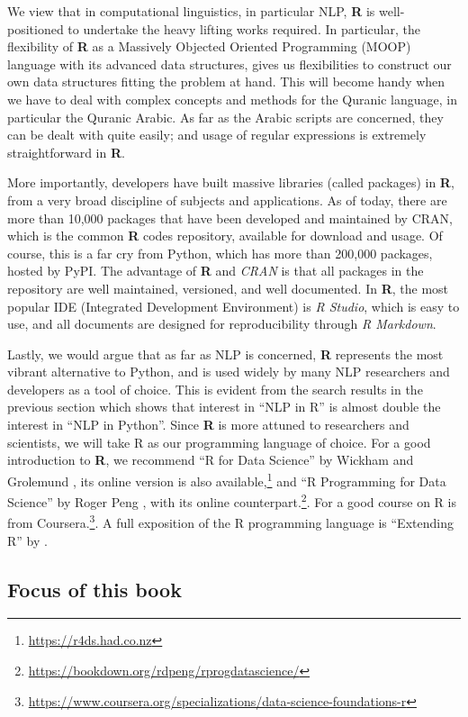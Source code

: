 \documentclass[
]{article}
\begin{document}
We view that in computational linguistics, in particular NLP, \textbf{R} is well-positioned to undertake the heavy lifting works required. In particular, the flexibility of \textbf{R} as a Massively Objected Oriented Programming (MOOP) language with its advanced data structures, gives us flexibilities to construct our own data structures fitting the problem at hand. This will become handy when we have to deal with complex concepts and methods for the Quranic language, in particular the Quranic Arabic. As far as the Arabic scripts are concerned, they can be dealt with quite easily; and usage of regular expressions is extremely straightforward in \textbf{R}.

More importantly, developers have built massive libraries (called packages) in \textbf{R}, from a very broad discipline of subjects and applications. As of today, there are more than 10,000 packages that have been developed and maintained by CRAN, which is the common \textbf{R} codes repository, available for download and usage. Of course, this is a far cry from Python, which has more than 200,000 packages, hosted by PyPI. The advantage of \textbf{R} and \emph{CRAN} is that all packages in the repository are well maintained, versioned, and well documented. In \textbf{R}, the most popular IDE (Integrated Development Environment) is \emph{R Studio}, which is easy to use, and all documents are designed for reproducibility through \emph{R Markdown}.

Lastly, we would argue that as far as NLP is concerned, \textbf{R} represents the most vibrant alternative to Python, and is used widely by many NLP researchers and developers as a tool of choice. This is evident from the search results in the previous section which shows that interest in ``NLP in R'' is almost double the interest in ``NLP in Python''. Since \textbf{R} is more attuned to researchers and scientists, we will take R as our programming language of choice. For a good introduction to \textbf{R}, we recommend ``R for Data Science'' by Wickham and Grolemund \citep{wickham2016}, its online version is also available,\footnote{\url{https://r4ds.had.co.nz}} and ``R Programming for Data Science'' by Roger Peng \citep{peng2014}, with its online counterpart.\footnote{\url{https://bookdown.org/rdpeng/rprogdatascience/}}. For a good course on R is from Coursera.\footnote{\url{https://www.coursera.org/specializations/data-science-foundations-r}}. A full exposition of the R programming language is ``Extending R'' by \citep{chambers2016}.

\hypertarget{focus-of-this-book}{%
\subsection{Focus of this book}\label{focus-of-this-book}}
\end{document}
